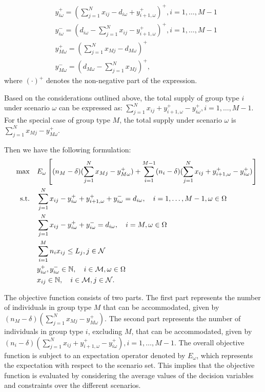 \begin{equation}\label{y_recursively}
\begin{aligned}
  & y_{i \omega}^{+}= (\sum_{j=1}^N x_{ij}- d_{i \omega} + y_{i+1, \omega}^{+})^{+}, i =1,\ldots, M-1 \\
  & y_{i \omega}^{-}= (d_{i \omega}- \sum_{j=1}^N x_{ij} - y_{i+1, \omega}^{+})^{+}, i =1,\ldots, M-1 \\
  & y_{M \omega}^{+} = (\sum_{j=1}^N x_{Mj} - d_{M \omega})^{+} \\ 
  & y_{M \omega}^{-} = (d_{M \omega}- \sum_{j=1}^N x_{Mj})^{+},
\end{aligned}
\end{equation}
where $(\cdot)^{+}$ denotes the non-negative part of the expression. 

Based on the considerations outlined above, the total supply of group type $i$ under scenario $\omega$ can be expressed as: $\sum_{j= 1}^{N} x_{ij} + y_{i+1,\omega}^{+} - y_{i \omega}^{+}, i = 1, \ldots, M-1$. For the special case of group type $M$, the total supply under scenario $\omega$ is $\sum_{j= 1}^{N} x_{Mj} - y_{M \omega}^{+}$.

Then we have the following formulation:
  \begin{align}
  \quad \max \quad & E_{\omega}\left[(n_{M}-\delta) (\sum_{j= 1}^{N} x_{Mj} - y_{M \omega}^{+}) + \sum_{i=1}^{M-1} (n_i-\delta) (\sum_{j= 1}^{N} x_{ij} + y_{i+1,\omega}^{+} - y_{i \omega}^{+})\right] \\
  \text {s.t.} \quad & \sum_{j= 1}^{N} x_{ij}-y_{i \omega}^{+}+
  y_{i+1, \omega}^{+} + y_{i \omega}^{-}=d_{i \omega}, \quad i = 1,\ldots, M-1, \omega \in \Omega \label{DEF_constr1} \\
  & \sum_{j= 1}^{N} x_{ij} -y_{i \omega}^{+}+y_{i \omega}^{-}=d_{i \omega}, \quad i = M, \omega \in \Omega \label{DEF_constr2}\\
  & \sum_{i=1}^{M} n_{i} x_{ij} \leq L_j, j \in \mathcal{N}  \label{DEF_constr3} \\
  & y_{i \omega}^{+}, y_{i \omega}^{-} \in \mathbb{N}, \quad i \in \mathcal{M}, \omega \in \Omega \notag \\
  & x_{ij} \in \mathbb{N}, \quad i \in \mathcal{M}, j \in \mathcal{N} \notag.
  \end{align}



The objective function consists of two parts. The first part represents the number of individuals in
group type $M$ that can be accommodated, given by $(n_{M}-\delta) (\sum_{j=1}^{N} x_{Mj} - y_{M\omega}^{+})$. The second part represents the number of individuals in group type $i$, excluding $M$, that can be accommodated, given by $(n_i-\delta) (\sum_{j=1}^{N} x_{ij} + y_{i+1,\omega}^{+} - y_{i\omega}^{+}), i = 1, \ldots, M-1$. The overall objective function is subject to an expectation operator denoted by $E_{\omega}$, which represents the expectation with respect to the scenario set. This implies that the objective function is evaluated by considering the average values of the decision variables and constraints over the different scenarios.

